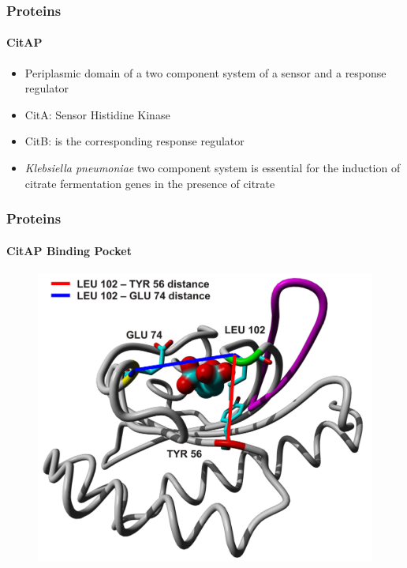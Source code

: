 \documentclass[english]{beamer}
\begin{document}

\begin{frame}
    \frametitle{Proteins}
    \framesubtitle{CitAP}

    \begin{itemize}
        \item Periplasmic domain of a two component system of a sensor and a response regulator
        \item CitA: Sensor Histidine Kinase
        \item CitB: is the corresponding response regulator
        \item \textit{Klebsiella pneumoniae} two component system is essential for the induction of citrate fermentation genes in the presence of citrate
    \end{itemize}
\end{frame} 


%


\begin{frame}
    \frametitle{Proteins}
    \framesubtitle{CitAP Binding Pocket}

    \begin{figure}
        \includegraphics[width=.7\linewidth]{figures/CitA_pocket2.pdf}
    \end{figure}     
\end{frame}     
\end{document}
